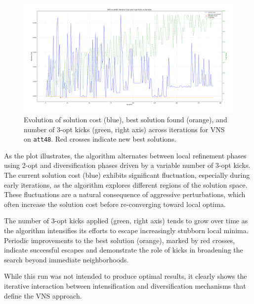 \begin{figure}[H]
    \centering
    \includegraphics[width=\textwidth]{images/vns_run_att48.png}
    \caption{Evolution of solution cost (blue), best solution found (orange), and number of 3-opt kicks (green, right axis) across iterations for VNS on \texttt{att48}. Red crosses indicate new best solutions.}
    \label{fig:vns_plot}
\end{figure}

As the plot illustrates, the algorithm alternates between local refinement phases using 2-opt and diversification phases driven by a variable number of 3-opt kicks. The current solution cost (blue) exhibits significant fluctuation, especially during early iterations, as the algorithm explores different regions of the solution space. These fluctuations are a natural consequence of aggressive perturbations, which often increase the solution cost before re-converging toward local optima.

The number of 3-opt kicks applied (green, right axis) tends to grow over time as the algorithm intensifies its efforts to escape increasingly stubborn local minima. Periodic improvements to the best solution (orange), marked by red crosses, indicate successful escapes and demonstrate the role of kicks in broadening the search beyond immediate neighborhoods.

While this run was not intended to produce optimal results, it clearly shows the iterative interaction between intensification and diversification mechanisms that define the VNS approach.
